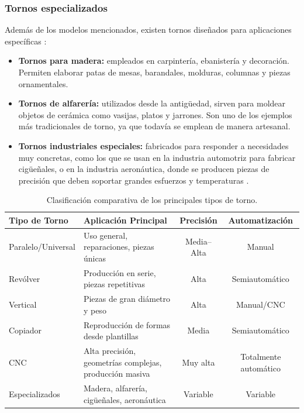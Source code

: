 \documentclass[12pt,a4paper]{article}
\begin{document}
\subsubsection{Tornos especializados}
Además de los modelos mencionados, existen tornos diseñados para aplicaciones específicas \cite{lascano2015}:
\begin{itemize}[itemsep=2pt, topsep=2pt, parsep=0pt]
    \item \textbf{Tornos para madera:} empleados en carpintería, ebanistería y decoración. Permiten elaborar patas de mesas, barandales, molduras, columnas y piezas ornamentales.
    \item \textbf{Tornos de alfarería:} utilizados desde la antigüedad, sirven para moldear objetos de cerámica como vasijas, platos y jarrones. Son uno de los ejemplos más tradicionales de torno, ya que todavía se emplean de manera artesanal.
    \item \textbf{Tornos industriales especiales:} fabricados para responder a necesidades muy concretas, como los que se usan en la industria automotriz para fabricar cigüeñales, o en la industria aeronáutica, donde se producen piezas de precisión que deben soportar grandes esfuerzos y temperaturas \cite{torno_protocolo}.
\end{itemize}

\begin{table}[H]
    \centering
    \small
    \renewcommand{\arraystretch}{1.25}
    \begin{tabularx}{\textwidth}{l X c c}
        \toprule
        \textbf{Tipo de Torno} & \textbf{Aplicación Principal} & \textbf{Precisión} & \textbf{Automatización} \\
        \midrule
        Paralelo/Universal & Uso general, reparaciones, piezas únicas & Media--Alta & Manual \\
        Revólver & Producción en serie, piezas repetitivas & Alta & Semiautomático \\
        Vertical & Piezas de gran diámetro y peso & Alta & Manual/CNC \\
        Copiador & Reproducción de formas desde plantillas & Media & Semiautomático \\
        CNC & Alta precisión, geometrías complejas, producción masiva & Muy alta & Totalmente automático \\
        Especializados & Madera, alfarería, cigüeñales, aeronáutica & Variable & Variable \\
        \bottomrule
    \end{tabularx}
    \caption{Clasificación comparativa de los principales tipos de torno.}
    \label{tab:clasificacion_tornos}
\end{table}
\end{document}
